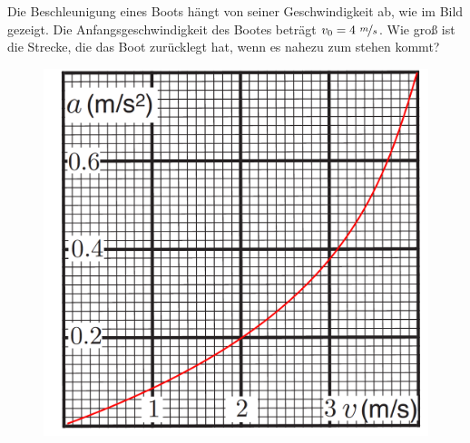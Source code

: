 \begin{Exercise}[label = boatgraph, origin = Jaan Kalda, difficulty = 4, title = Bootsbewegung]
	Die Beschleunigung eines Boots hängt von seiner Geschwindigkeit ab, wie im Bild gezeigt. Die Anfangsgeschwindigkeit des Bootes beträgt $v_0 = 4~\nicefrac{m}{s}$. Wie groß ist die Strecke, die das Boot zurücklegt hat, wenn es nahezu zum stehen kommt?
\end{Exercise}
\begin{figure}[h]
	\centering
	\includegraphics[scale = 0.4]{../tasks/kalda/boatgraph1}
\end{figure}